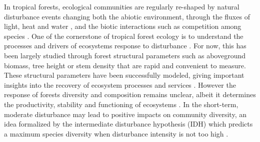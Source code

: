\documentclass[fleqn,10pt]{ArtEcoFoG} %
\begin{document}
In tropical forests, ecological communities are regularly re-shaped by
natural disturbance events changing both the abiotic environment,
through the fluxes of light, heat and water \citep{Goulamoussene2017},
and the biotic interactions such as competition among species
\citep{Chesson2000}. One of the cornerstone of tropical forest ecology
is to understand the processes and drivers of ecosystems response to
disturbance \citep{Chazdon2003a}. For now, this has been largely studied
through forest structural parameters such as aboveground biomass, tree
height or stem density \citep{Piponiot2016, Rutishauser2016} that are
rapid and convenient to measure. These structural parameters have been
successfully modeled, giving important insights into the recovery of
ecosystem processes and services \citep{Herault2018}. However the
response of forests diversity and composition remains unclear, albeit it
determines the productivity, stability and functioning of ecosystems
\citep{Tilman2014, Liang2016}. In the short-term, moderate disturbance
may lead to positive impacts on community diversity, an idea formalized
by the intermediate disturbance hypothesis (IDH) which predicts a
maximum species diversity when disturbance intensity is not too high
\citep{Molino2001, Kariuki2006a}.
\end{document}
